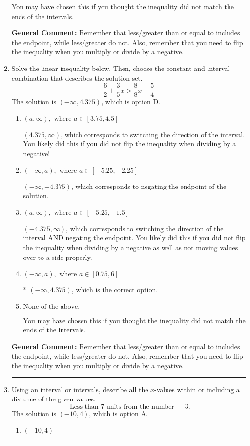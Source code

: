 \documentclass{extbook}[14pt]
\newcommand{\litem}[1]{\item #1

\rule{\textwidth}{0.4pt}}
\begin{document}
\begin{enumerate}
{\begin{enumerate}[label=\Alph*.]
You may have chosen this if you thought the inequality did not match the ends of the intervals.
\end{enumerate}

\textbf{General Comment:} Remember that less/greater than or equal to includes the endpoint, while less/greater do not. Also, remember that you need to flip the inequality when you multiply or divide by a negative.
}
\litem{
Solve the linear inequality below. Then, choose the constant and interval combination that describes the solution set.
\[ \frac{6}{2} + \frac{3}{5} x > \frac{8}{8} x + \frac{5}{4} \]The solution is \( (-\infty, 4.375) \), which is option D.\begin{enumerate}[label=\Alph*.]
\item \( (a, \infty), \text{ where } a \in [3.75, 4.5] \)

 $(4.375, \infty)$, which corresponds to switching the direction of the interval. You likely did this if you did not flip the inequality when dividing by a negative!
\item \( (-\infty, a), \text{ where } a \in [-5.25, -2.25] \)

 $(-\infty, -4.375)$, which corresponds to negating the endpoint of the solution.
\item \( (a, \infty), \text{ where } a \in [-5.25, -1.5] \)

 $(-4.375, \infty)$, which corresponds to switching the direction of the interval AND negating the endpoint. You likely did this if you did not flip the inequality when dividing by a negative as well as not moving values over to a side properly.
\item \( (-\infty, a), \text{ where } a \in [0.75, 6] \)

* $(-\infty, 4.375)$, which is the correct option.
\item \( \text{None of the above}. \)

You may have chosen this if you thought the inequality did not match the ends of the intervals.
\end{enumerate}

\textbf{General Comment:} Remember that less/greater than or equal to includes the endpoint, while less/greater do not. Also, remember that you need to flip the inequality when you multiply or divide by a negative.
}
\litem{
Using an interval or intervals, describe all the $x$-values within or including a distance of the given values.
\[ \text{ Less than } 7 \text{ units from the number } -3. \]The solution is \( (-10, 4) \), which is option A.\begin{enumerate}[label=\Alph*.]
\item \( (-10, 4) \)


\end{enumerate}}
\end{enumerate}
\end{document}
